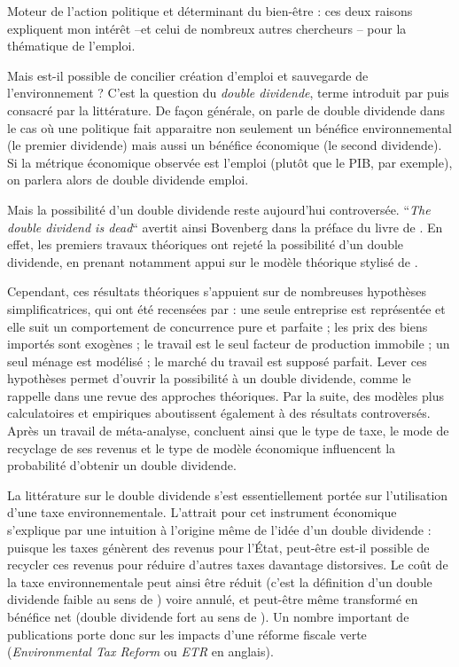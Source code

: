 Moteur de l'action politique et déterminant du bien-être : ces deux raisons expliquent mon intérêt --et celui de nombreux autres chercheurs -- pour la thématique de l'emploi.

Mais est-il possible de concilier création d'emploi et sauvegarde de l'environnement ? C'est la question du \textit{double dividende}, terme introduit par \citet{Pearce1991} puis consacré par la littérature. 
De façon générale, on parle de double dividende dans le cas où une politique fait apparaitre non seulement un bénéfice environnemental (le premier dividende) mais aussi un bénéfice économique (le second dividende). 
Si la métrique économique observée est l'emploi (plutôt que le PIB, par exemple), on parlera alors de double dividende emploi.

Mais la possibilité d'un double dividende reste aujourd'hui controversée. “\textit{The double dividend is dead}“ avertit ainsi Bovenberg dans la préface du livre de \citet{DeMooij2000}. En effet, les premiers travaux théoriques ont rejeté la possibilité d'un double dividende, en prenant notamment appui sur le modèle théorique stylisé de \citet{Bovenberg1994a}. 

Cependant, ces résultats théoriques s'appuient sur de nombreuses hypothèses simplificatrices, qui ont été recensées par \citet{Thubin2012} : une seule entreprise est représentée et elle suit un comportement de concurrence pure et parfaite ; les prix des biens importés sont exogènes ; le travail est le seul facteur de production immobile ; un seul ménage est modélisé ; le marché du travail est supposé parfait. 
Lever ces hypothèses permet d'ouvrir la possibilité à un double dividende, comme le rappelle \citet{Chiroleu-Assouline2001} dans une revue des approches théoriques. Par la suite, des modèles plus calculatoires et empiriques aboutissent également à des résultats controversés. Après un travail de méta-analyse, \citet{Patuelli2005} concluent ainsi que le type de taxe, le mode de recyclage de ses revenus et le type de modèle économique influencent la probabilité d'obtenir un double dividende.

La littérature sur le double dividende s'est essentiellement portée sur l'utilisation d'une taxe environnementale. L'attrait pour cet instrument économique s'explique par une intuition à l'origine même de l'idée d'un double dividende : puisque les taxes génèrent des revenus pour l'État, peut-être est-il possible de recycler ces revenus pour réduire d'autres taxes davantage distorsives. Le coût de la taxe environnementale peut ainsi être réduit (c'est la définition d'un double dividende faible au sens de \citet{Goulder1994}) voire annulé, et peut-être même transformé en bénéfice net (double dividende fort au sens de \citet{Goulder1994}). Un nombre important de publications porte donc sur les impacts d'une réforme fiscale verte (\textit{Environmental Tax Reform} ou \textit{ETR} en anglais). 


